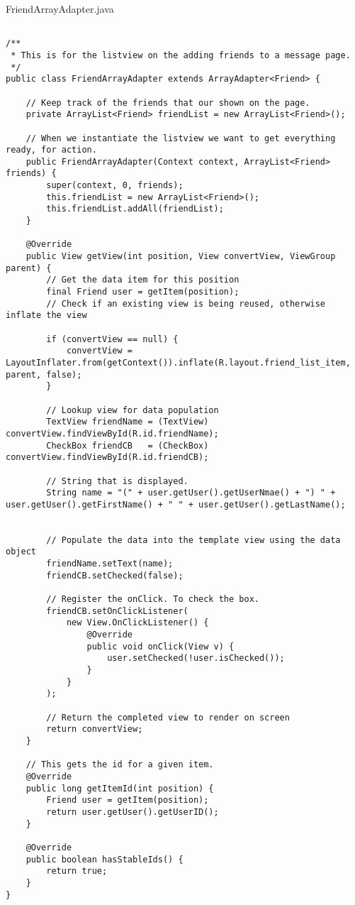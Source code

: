 FriendArrayAdapter.java
\begin{lstlisting}

/**
 * This is for the listview on the adding friends to a message page.
 */
public class FriendArrayAdapter extends ArrayAdapter<Friend> {

    // Keep track of the friends that our shown on the page.
    private ArrayList<Friend> friendList = new ArrayList<Friend>();

    // When we instantiate the listview we want to get everything ready, for action.
    public FriendArrayAdapter(Context context, ArrayList<Friend> friends) {
        super(context, 0, friends);
        this.friendList = new ArrayList<Friend>();
        this.friendList.addAll(friendList);
    }

    @Override
    public View getView(int position, View convertView, ViewGroup parent) {
        // Get the data item for this position
        final Friend user = getItem(position);
        // Check if an existing view is being reused, otherwise inflate the view

        if (convertView == null) {
            convertView = LayoutInflater.from(getContext()).inflate(R.layout.friend_list_item, parent, false);
        }

        // Lookup view for data population
        TextView friendName = (TextView) convertView.findViewById(R.id.friendName);
        CheckBox friendCB   = (CheckBox) convertView.findViewById(R.id.friendCB);

        // String that is displayed.
        String name = "(" + user.getUser().getUserNmae() + ") " + user.getUser().getFirstName() + " " + user.getUser().getLastName();


        // Populate the data into the template view using the data object
        friendName.setText(name);
        friendCB.setChecked(false);

        // Register the onClick. To check the box.
        friendCB.setOnClickListener(
            new View.OnClickListener() {
                @Override
                public void onClick(View v) {
                    user.setChecked(!user.isChecked());
                }
            }
        );

        // Return the completed view to render on screen
        return convertView;
    }

    // This gets the id for a given item.
    @Override
    public long getItemId(int position) {
        Friend user = getItem(position);
        return user.getUser().getUserID();
    }

    @Override
    public boolean hasStableIds() {
        return true;
    }
}
\end{lstlisting}

